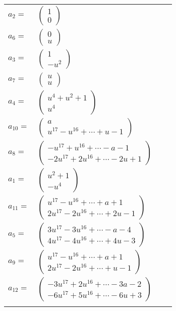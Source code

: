 \documentclass[1p]{elsarticle_modified}
\theoremstyle{definition}
\begin{document}
\begin{tabular}{m{7pt} m{180pt} m{7pt} m{180pt} }
\flushright $a_{2}=$&$\begin{pmatrix}1\\0\end{pmatrix}$ \\
\flushright $a_{6}=$&$\begin{pmatrix}0\\u\end{pmatrix}$ \\
\flushright $a_{3}=$&$\begin{pmatrix}1\\- u^2\end{pmatrix}$ \\
\flushright $a_{7}=$&$\begin{pmatrix}u\\u\end{pmatrix}$ \\
\flushright $a_{4}=$&$\begin{pmatrix}u^4+u^2+1\\u^4\end{pmatrix}$ \\
\flushright $a_{10}=$&$\begin{pmatrix}a\\u^{17}- u^{16}+\cdots+u-1\end{pmatrix}$ \\
\flushright $a_{8}=$&$\begin{pmatrix}- u^{17}+u^{16}+\cdots- a-1\\-2 u^{17}+2 u^{16}+\cdots-2 u+1\end{pmatrix}$ \\
\flushright $a_{1}=$&$\begin{pmatrix}u^2+1\\- u^4\end{pmatrix}$ \\
\flushright $a_{11}=$&$\begin{pmatrix}u^{17}- u^{16}+\cdots+a+1\\2 u^{17}-2 u^{16}+\cdots+2 u-1\end{pmatrix}$ \\
\flushright $a_{5}=$&$\begin{pmatrix}3 u^{17}-3 u^{16}+\cdots- a-4\\4 u^{17}-4 u^{16}+\cdots+4 u-3\end{pmatrix}$ \\
\flushright $a_{9}=$&$\begin{pmatrix}u^{17}- u^{16}+\cdots+a+1\\2 u^{17}-2 u^{16}+\cdots+u-1\end{pmatrix}$ \\
\flushright $a_{12}=$&$\begin{pmatrix}-3 u^{17}+2 u^{16}+\cdots-3 a-2\\-6 u^{17}+5 u^{16}+\cdots-6 u+3\end{pmatrix}$\\&\end{tabular}
\end{document}
